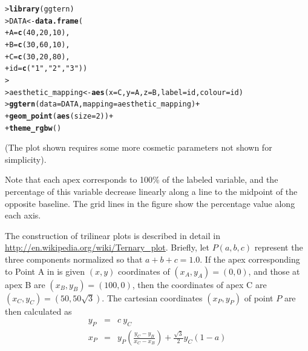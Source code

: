 \documentclass[10pt,krantz2]{krantz}\usepackage[]{graphicx}\usepackage[]{color}
\makeatletter
\newcommand{\hlnum}[1]{\textcolor[rgb]{0.686,0.059,0.569}{#1}}%
\newcommand{\hlstr}[1]{\textcolor[rgb]{0.192,0.494,0.8}{#1}}%
\newcommand{\hlopt}[1]{\textcolor[rgb]{0,0,0}{#1}}%
\newcommand{\hlstd}[1]{\textcolor[rgb]{0.345,0.345,0.345}{#1}}%
\newcommand{\hlkwb}[1]{\textcolor[rgb]{0.69,0.353,0.396}{#1}}%
\newcommand{\hlkwc}[1]{\textcolor[rgb]{0.333,0.667,0.333}{#1}}%
\newcommand{\hlkwd}[1]{\textcolor[rgb]{0.737,0.353,0.396}{\textbf{#1}}}%
\newenvironment{kframe}{%
 \def\at@end@of@kframe{}%
 \ifinner\ifhmode%
  \def\at@end@of@kframe{\end{minipage}}%
  \begin{minipage}{\columnwidth}%
 \fi\fi%
 \def\FrameCommand##1{\hskip\@totalleftmargin \hskip-\fboxsep
 \colorbox{shadecolor}{##1}\hskip-\fboxsep
     \hskip-\linewidth \hskip-\@totalleftmargin \hskip\columnwidth}%
 \MakeFramed {\advance\hsize-\width
   \@totalleftmargin\z@ \linewidth\hsize
   \@setminipage}}%
 {\par\unskip\endMakeFramed%
 \at@end@of@kframe}
\newenvironment{knitrout}{}{} %
\renewenvironment{knitrout}{\small\renewcommand{\baselinestretch}{.85}}{} %
\makeatother
\begin{document}
\begin{knitrout}
\color{fgcolor}\begin{kframe}
\begin{alltt}
\hlstd{> }\hlkwd{library}\hlstd{(ggtern)}
\hlstd{> }\hlstd{DATA} \hlkwb{<-} \hlkwd{data.frame}\hlstd{(}
\hlstd{+ }  \hlkwc{A} \hlstd{=} \hlkwd{c}\hlstd{(}\hlnum{40}\hlstd{,} \hlnum{20}\hlstd{,} \hlnum{10}\hlstd{),}
\hlstd{+ }  \hlkwc{B} \hlstd{=} \hlkwd{c}\hlstd{(}\hlnum{30}\hlstd{,} \hlnum{60}\hlstd{,} \hlnum{10}\hlstd{),}
\hlstd{+ }  \hlkwc{C} \hlstd{=} \hlkwd{c}\hlstd{(}\hlnum{30}\hlstd{,} \hlnum{20}\hlstd{,} \hlnum{80}\hlstd{),}
\hlstd{+ }  \hlkwc{id} \hlstd{=} \hlkwd{c}\hlstd{(}\hlstr{"1"}\hlstd{,} \hlstr{"2"}\hlstd{,} \hlstr{"3"}\hlstd{))}
\hlstd{> }
\hlstd{> }\hlstd{aesthetic_mapping} \hlkwb{<-} \hlkwd{aes}\hlstd{(}\hlkwc{x} \hlstd{= C,} \hlkwc{y} \hlstd{= A,} \hlkwc{z} \hlstd{= B,} \hlkwc{label} \hlstd{= id,} \hlkwc{colour} \hlstd{= id)}
\hlstd{> }\hlkwd{ggtern}\hlstd{(}\hlkwc{data} \hlstd{= DATA,} \hlkwc{mapping} \hlstd{= aesthetic_mapping)} \hlopt{+}
\hlstd{+ }    \hlkwd{geom_point}\hlstd{(}\hlkwd{aes}\hlstd{(}\hlkwc{size} \hlstd{=} \hlnum{2}\hlstd{))} \hlopt{+}
\hlstd{+ }    \hlkwd{theme_rgbw}\hlstd{()}
\end{alltt}
\end{kframe}
\end{knitrout}
\noindent (The plot shown requires some more cosmetic parameters not
shown for simplicity).

Note that each apex corresponds to 100\% of the labeled
variable, and the percentage of this variable decrease
linearly along a line to the midpoint of the opposite
baseline.
The grid lines in the figure show the percentage value along
each axis.

The construction of trilinear plots is described in detail
in \url{http://en.wikipedia.org/wiki/Ternary_plot}.
Briefly, let $P(a, b, c)$ represent the three components  normalized so
that $a + b + c = 1.0$.
If the apex corresponding to Point A in 
is given $(x, y)$ coordinates of $(x_A, y_A) = (0, 0)$,
and those at apex B are $(x_B, y_B) = (100, 0)$,
then the coordinates of apex C are $(x_C, y_C) = (50, 50\sqrt{3})$.
The cartesian coordinates $(x_P, y_P)$  of point $P$ are then calculated as
\begin{eqnarray*}
y_P & = & c \: y_C \\
x_P & = & y_P \left( \frac{y_C - y_B}{x_C - x_B} \right)
+ \frac{\sqrt{3}}{2} y_C (1 - a) \\
\end{eqnarray*}
\end{document}
